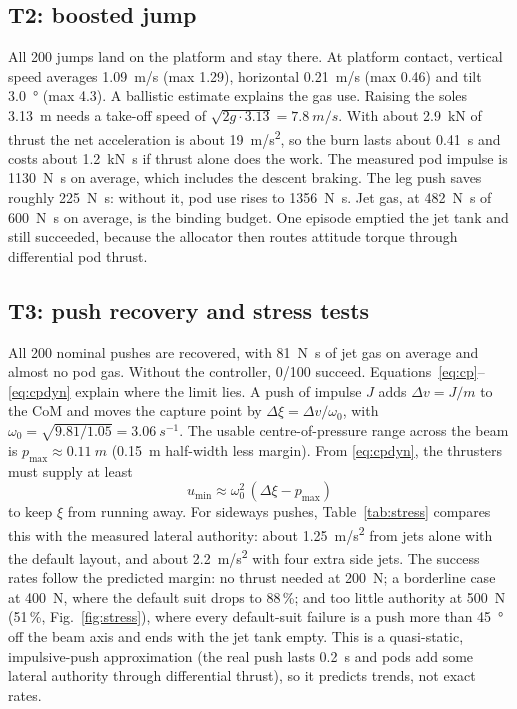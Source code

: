 \documentclass[conference]{IEEEtran}
\begin{document}
\subsection{T2: boosted jump}
All 200 jumps land on the platform and stay there. At platform contact, vertical speed averages \SI{1.09}{m/s} (max 1.29), horizontal \SI{0.21}{m/s} (max 0.46) and tilt \SI{3.0}{\degree} (max 4.3). A ballistic estimate explains the gas use. Raising the soles \SI{3.13}{m} needs a take-off speed of $\sqrt{2g\cdot3.13}=\SI{7.8}{m/s}$. With about \SI{2.9}{kN} of thrust the net acceleration is about \SI{19}{m/s^2}, so the burn lasts about \SI{0.41}{s} and costs about \SI{1.2}{kN.s} if thrust alone does the work. The measured pod impulse is \SI{1130}{N.s} on average, which includes the descent braking. The leg push saves roughly \SI{225}{N.s}: without it, pod use rises to \SI{1356}{N.s}. Jet gas, at \SI{482}{N.s} of \SI{600}{N.s} on average, is the binding budget. One episode emptied the jet tank and still succeeded, because the allocator then routes attitude torque through differential pod thrust.

\subsection{T3: push recovery and stress tests}
All 200 nominal pushes are recovered, with \SI{81}{N.s} of jet gas on average and almost no pod gas. Without the controller, 0/100 succeed. Equations~\eqref{eq:cp}--\eqref{eq:cpdyn} explain where the limit lies. A push of impulse $J$ adds $\Delta v=J/m$ to the CoM and moves the capture point by $\Delta\xi=\Delta v/\omega_0$, with $\omega_0=\sqrt{9.81/1.05}=\SI{3.06}{s^{-1}}$. The usable centre-of-pressure range across the beam is $p_{\max}\approx\SI{0.11}{m}$ (\SI{0.15}{m} half-width less margin). From \eqref{eq:cpdyn}, the thrusters must supply at least
\begin{equation}
u_{\min}\approx\omega_0^2\,(\Delta\xi-p_{\max})
\label{eq:umin}
\end{equation}
to keep $\xi$ from running away. For sideways pushes, Table~\ref{tab:stress} compares this with the measured lateral authority: about \SI{1.25}{m/s^2} from jets alone with the default layout, and about \SI{2.2}{m/s^2} with four extra side jets. The success rates follow the predicted margin: no thrust needed at \SI{200}{N}; a borderline case at \SI{400}{N}, where the default suit drops to 88\,\%; and too little authority at \SI{500}{N} (51\,\%, Fig.~\ref{fig:stress}), where every default-suit failure is a push more than \SI{45}{\degree} off the beam axis and ends with the jet tank empty. This is a quasi-static, impulsive-push approximation (the real push lasts \SI{0.2}{s} and pods add some lateral authority through differential thrust), so it predicts trends, not exact rates.
\end{document}
